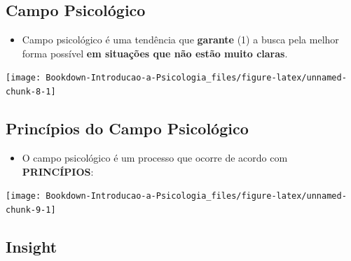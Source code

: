 \documentclass[
]{book}
\providecommand{\tightlist}{%
  \setlength{\itemsep}{0pt}\setlength{\parskip}{0pt}}
\begin{document}
\hypertarget{campo-psicoluxf3gico}{%
\subsection{Campo Psicológico}\label{campo-psicoluxf3gico}}

\begin{itemize}
\tightlist
\item
  Campo psicológico é uma tendência que \textbf{garante} (1) a busca pela melhor forma possível \textbf{em situações que não estão muito claras}.
\end{itemize}

\texttt{[image: Bookdown-Introducao-a-Psicologia\_files/figure-latex/unnamed-chunk-8-1]}

\hypertarget{princuxedpios-do-campo-psicoluxf3gico}{%
\subsection{Princípios do Campo Psicológico}\label{princuxedpios-do-campo-psicoluxf3gico}}

\begin{itemize}
\tightlist
\item
  O campo psicológico é um processo que ocorre de acordo com \textbf{PRINCÍPIOS}:
\end{itemize}

\texttt{[image: Bookdown-Introducao-a-Psicologia\_files/figure-latex/unnamed-chunk-9-1]}

\hypertarget{insight}{%
\subsection{Insight}\label{insight}}
\end{document}
